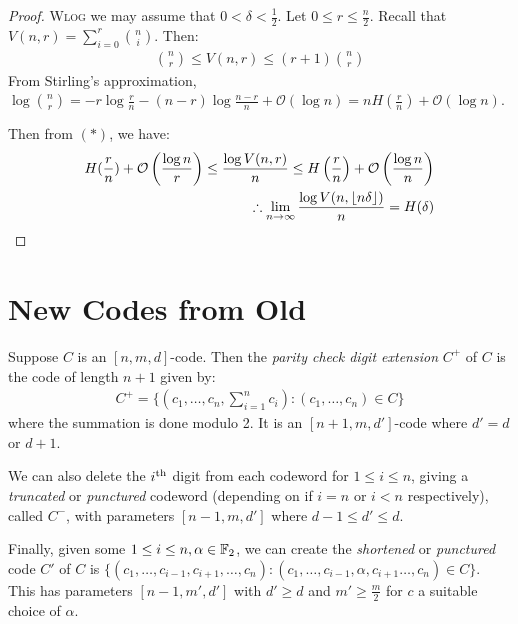 \documentclass[10pt,a4paper]{article}
\begin{document}
\begin{proof}
\textsc{Wlog} we may assume that $0 < \delta < \frac12$. Let $0 \leq r \leq \frac{n}{2}$. Recall that $V(n,r) = \sum_{i=0}^r \binom{n}{i}$. Then:
\begin{align*}
\binom{n}{r} \leq V(n,r) \leq (r+1)\binom{n}{r} \tag{(\ast)}
\end{align*}
From Stirling's approximation, $\log\binom{n}{r} = -r\log \frac{r}{n} - (n-r)\log\frac{n-r}{n} + \mathcal{O}(\log n) = nH(\frac{r}{n}) + \mathcal{O}(\log n)$.

Then from $(\ast)$, we have:
\begin{align*}
H(\frac{r}{n}) + \mathcal{O}\left(\frac{\log n}{r}\right) \leq \frac{\log V(n,r)}{n} \leq H\left(\frac{r}{n}\right) + \mathcal{O}\left(\frac{\log n}{n}\right)\\
\therefore \lim_{n\to\infty} \frac{\log V(n, \lfloor n\delta \rfloor)}{n} = H(\delta)
\end{align*}
\end{proof}
\section{New Codes from Old}
Suppose $C$ is an $[n,m,d]$-code. Then the \emph{parity check digit extension} $C^+$ of $C$ is the code of length $n+1$ given by:
\begin{align*}
C^+ = \{(c_1, \ldots, c_n, \sum_{i=1}^n c_i) : (c_1, \ldots, c_n) \in C\}
\end{align*}
where the summation is done modulo 2. It is an $[n+1, m, d']$-code where $d' = d$ or $d+1$.

We can also delete the $i\textsuperscript{th}$ digit from each codeword for $1 \leq i\leq n$, giving a \emph{truncated} or \emph{punctured} codeword (depending on if $i=n$ or $i<n$ respectively), called $C^-$, with parameters $[n-1, m, d']$ where $d-1 \leq d' \leq d$.

Finally, given some $1 \leq i \leq n, \alpha \in \mathbb{F}_2$, we can create the \emph{shortened} or \emph{punctured} code $C'$ of $C$ is $\{(c_1, \ldots, c_{i-1},c_{i+1}, \ldots, c_n) : (c_1, \ldots, c_{i-1}, \alpha, c_{i+1} \ldots, c_n) \in C\}$. This has parameters $[n-1, m', d']$ with $d' \geq d$ and $m' \geq \frac{m}{2}$ for $c$ a suitable choice of $\alpha$.
\end{document}
